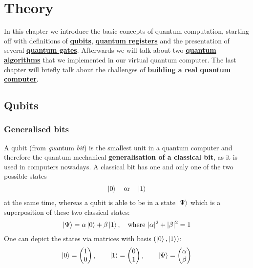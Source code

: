 \documentclass[bibliography=totocnumbered]{article}
\theoremstyle{NoticeStyle}
\begin{document}
%
\section{Theory}

In this chapter we introduce the basic concepts of quantum computation, starting off with definitions of \hyperref[sec:Qubits]{\textbf{qubits}}, \hyperref[sec:Quantum register]{\textbf{quantum registers}} and the presentation of several \hyperref[sec:Quantum gates]{\textbf{quantum gates}}. Afterwards we will talk about two \hyperref[sec:Quantum algorithms]{\textbf{quantum algorithms}} that we implemented in our virtual quantum computer. The last chapter will briefly talk about the challenges of \hyperref[sec:Building a quantum computer]{\textbf{building a real quantum computer}}.

\subsection{Qubits}\label{sec:Qubits}

\subsubsection{Generalised bits}
A qubit (from \textit{qu}antum \textit{bit}) is the smallest unit in a quantum computer and therefore the quantum mechanical \textbf{generalisation of a classical bit}, as it is used in computers nowadays. A classical bit has one and only one of the two possible states
%
\begin{align}
	\ket{0} \quad \text{or} \quad \ket{1}
\end{align}
%
at the same time, whereas a qubit is able to be in a state $\ket{\Psi}$ which is a superposition of these two classical states:
%
\begin{align}
	\ket{\Psi} = \alpha \ket{0} + \beta \ket{1}, \quad \text{where }|\alpha|^2 + |\beta|^2 = 1	\label{eq:Superpos of qubit}
\end{align}
%
%
One can depict the states via matrices with basis $(\ket{0}, \ket{1})$:
\begin{align}
	\ket{0} = \begin{pmatrix}1\\0 \end{pmatrix}, \quad\quad \ket{1} = \begin{pmatrix}0\\1 \end{pmatrix}, \quad\quad \ket{\Psi} = \begin{pmatrix}\alpha\\\beta \end{pmatrix}
\end{align}
\end{document}
